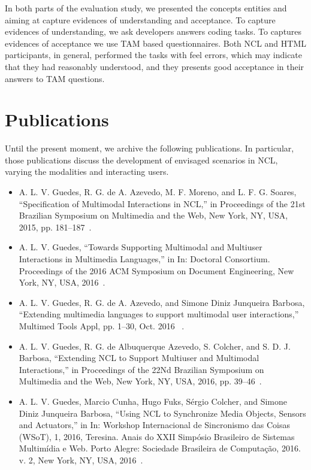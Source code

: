 In both parts of the evaluation study, we presented the concepts entities and aiming at capture evidences of understanding and acceptance. To capture evidences of understanding, we ask developers answers coding tasks. To captures evidences of acceptance we use TAM based questionnaires. Both NCL and HTML participants, in general, performed the tasks with feel errors, which may indicate that they had reasonably understood, and they presents good acceptance in their answers to TAM questions.

\section{Publications}
\label{sec:publications}

Until the present moment, we archive the following
publications. In particular, those publications discuss the development of envisaged scenarios in NCL, varying the modalities and interacting users.

\begin{itemize}
	\item	 A. L. V. Guedes, R. G. de A. Azevedo, M. F. Moreno, and L. F. G.
	Soares, “Specification of Multimodal Interactions in NCL,” in Proceedings of
	the 21st Brazilian Symposium on Multimedia and the Web, New York, NY, USA,
	2015, pp. 181–187~\cite{guedes_specification_2015}.
	\item	A. L. V. Guedes, “Towards Supporting Multimodal and Multiuser
	Interactions in Multimedia Languages,” in In: Doctoral Consortium. Proceedings
	of the 2016 ACM Symposium on Document Engineering, New York, NY, USA,
	2016~\cite{guedes_towards_2016}.
	\item	A. L. V. Guedes, R. G. de A. Azevedo, and Simone Diniz Junqueira
	Barbosa, “Extending multimedia languages to support multimodal user
	interactions,” Multimed Tools Appl, pp. 1–30, Oct. 2016
	~\cite{guedes_extending_2016}.
	\item	A. L. V. Guedes, R. G. de Albuquerque Azevedo, S. Colcher, and S. D. J.
	Barbosa, “Extending NCL to Support Multiuser and Multimodal Interactions,” in
	Proceedings of the 22Nd Brazilian Symposium on Multimedia and the Web, New
	York, NY, USA, 2016, pp. 39–46~\cite{guedes_extending_2016-1}.
	\item	A. L. V. Guedes, Marcio Cunha, Hugo Fuks, Sérgio Colcher, and Simone
	Diniz Junqueira Barbosa, “Using NCL to Synchronize Media Objects, Sensors and
	Actuators,” in In: Workshop Internacional de Sincronismo das Coisas (WSoT), 1,
	2016, Teresina. Anais do XXII Simpósio Brasileiro de Sistemas Multimídia e
	Web. Porto Alegre: Sociedade Brasileira de Computação, 2016. v. 2, New York,
	NY, USA, 2016~\cite{guedes_using_2016}.

\end{itemize}


